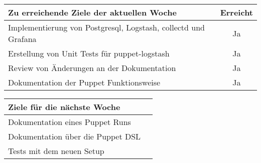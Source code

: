 \begin{tabularx}{\textwidth}{Xc}
    \arrayrulecolor{OliveGreen}
    \toprule
    {\bfseries Zu erreichende Ziele der aktuellen Woche} & {\bfseries Erreicht} \\
    \midrule[2pt]
    Implementierung von Postgresql, Logstash, collectd und Grafana &Ja          \\
    \rowcolor{OliveGreen!15}
    Erstellung von Unit Tests für puppet-logstash        &Ja                    \\
    \rowcolor{White}
    Review von Änderungen an der Dokumentation           &Ja                    \\
    \rowcolor{OliveGreen!15}
    Dokumentation der Puppet Funktionsweise              &Ja                    \\
    \bottomrule[2pt]
\end{tabularx}
%
\vspace{1cm}
%
\begin{tabularx}{\textwidth}{Xc}
    \arrayrulecolor{OliveGreen}
    \toprule
    {\bfseries Ziele für die nächste Woche}              &                      \\
    \midrule[2pt]
    Dokumentation eines Puppet Runs                      &                      \\
    \rowcolor{OliveGreen!15}
    Dokumentation über die Puppet DSL                    &                      \\
    \rowcolor{White}
    Tests mit dem neuen Setup                            &                      \\
\end{tabularx}
